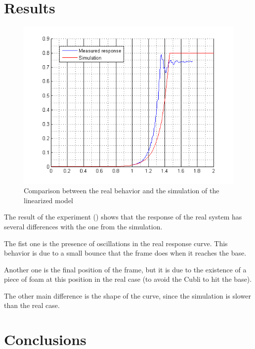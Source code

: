 \section*{Results}
\begin{figure}[H] 
	\centering 
	\includegraphics[scale=0.9]{figures/comparisonRealModel}
	\caption{Comparison between the real behavior and the simulation of the linearized model}
	\label{comparisonRealModel}
\end{figure} 

The result of the experiment () shows that the response of the real system has several differences with the one from the simulation.

The fist one is the presence of oscillations in the real response curve. This behavior is due to a small bounce that the frame does when it reaches the base.

Another one is the final position of the frame, but it is due to the existence of a piece of foam at this position in the real case (to avoid the Cubli to hit the base).

The other main difference is the shape of the curve, since the simulation is slower than the real case.

\section*{Conclusions}

